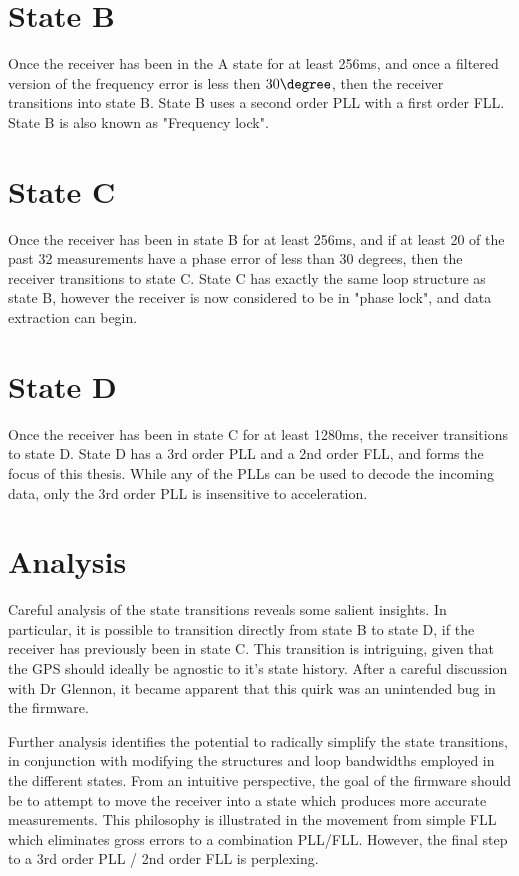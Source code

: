 \section{State B}
Once the receiver has been in the A state for at least 256ms, and once a filtered version of the frequency error is less then $30 \degree$, then the receiver transitions into state B. State B uses a second order PLL with a first order FLL. State B is also known as "Frequency lock".


\section{State C}
Once the receiver has been in state B for at least 256ms, and if at least 20 of the past 32 measurements have a phase error of less than 30 degrees, then the receiver transitions to state C. State C has exactly the same loop structure as state B, however the receiver is now considered to be in "phase lock", and data extraction can begin.

\section{State D}
Once the receiver has been in state C for at least 1280ms, the receiver transitions to state D. State D has a 3rd order PLL and a 2nd order FLL, and forms the focus of this thesis. While any of the PLLs can be used to decode the incoming data, only the 3rd order PLL is insensitive to acceleration.  



\section{Analysis}
Careful analysis of the state transitions reveals some salient insights. In particular, it is possible to transition directly from state B to state D, if the receiver has previously been in state C. This transition is intriguing, given that the GPS should ideally be agnostic to it's state history. After a careful discussion with Dr Glennon, it became apparent that this quirk was an unintended bug in the firmware.

Further analysis identifies the potential to radically simplify the state transitions, in conjunction with modifying the structures and loop bandwidths employed in the different states. From an intuitive perspective, the goal of the firmware should be to attempt to move the receiver into a state which produces more accurate measurements. This philosophy is illustrated in the movement from simple FLL which eliminates gross errors to a combination  PLL/FLL. However, the final step to a 3rd order PLL / 2nd order FLL is perplexing. 


